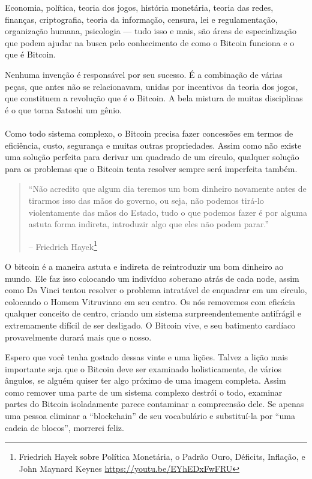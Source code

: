 Economia, política, teoria dos jogos, história monetária, teoria das redes, finanças, criptografia, teoria da informação, censura, lei e regulamentação, organização humana, psicologia --- tudo isso e mais, são áreas de especialização que podem ajudar na busca pelo conhecimento de como o Bitcoin funciona e o que é Bitcoin.

Nenhuma invenção é responsável por seu sucesso. É a combinação de várias peças, que antes não se relacionavam, unidas por incentivos da teoria dos jogos, que constituem a revolução que é o Bitcoin. A bela mistura de muitas disciplinas é o que torna Satoshi um gênio.

\paragraph{}
Como todo sistema complexo, o Bitcoin precisa fazer concessões em termos de eficiência, custo, segurança e muitas outras propriedades. Assim como não existe uma solução perfeita para derivar um quadrado de um círculo, qualquer solução para os problemas que o Bitcoin tenta resolver sempre será imperfeita também.

\begin{quotation}\begin{samepage}
\enquote{Não acredito que algum dia teremos um bom dinheiro novamente antes de tirarmos isso das mãos do governo, ou seja, não podemos tirá-lo violentamente das mãos do Estado, tudo o que podemos fazer é por alguma astuta forma indireta, introduzir algo que eles não podem parar.}
\begin{flushright} -- Friedrich Hayek\footnote{Friedrich Hayek sobre Política Monetária, o Padrão Ouro, Déficits, Inflação, e John Maynard Keynes \url{https://youtu.be/EYhEDxFwFRU}}
\end{flushright}\end{samepage}\end{quotation}

O bitcoin é a maneira astuta e indireta de reintroduzir um bom dinheiro ao mundo. Ele faz isso colocando um indivíduo soberano atrás de cada node, assim como Da Vinci tentou resolver o problema intratável de enquadrar em um círculo, colocando o Homem Vitruviano em seu centro. Os nós removemos com eficácia qualquer conceito de centro, criando um sistema surpreendentemente antifrágil e extremamente difícil de ser desligado. O Bitcoin vive, e seu batimento cardíaco provavelmente durará mais que o nosso.

Espero que você tenha gostado dessas vinte e uma lições. Talvez a lição mais importante seja que o Bitcoin deve ser examinado holisticamente, de vários ângulos, se alguém quiser ter algo próximo de uma imagem completa. Assim como remover uma parte de um sistema complexo destrói o todo, examinar partes do Bitcoin isoladamente parece contaminar a compreensão dele. Se apenas uma pessoa eliminar a \enquote{blockchain} de seu vocabulário e substituí-la por \enquote{uma cadeia de blocos}, morrerei feliz.

